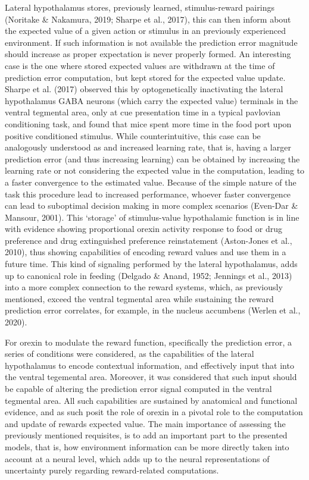 \documentclass[
]{/home/nicoluarte/Downloads/templates/PNAS-template-main.tex}
\begin{document}
Lateral hypothalamus stores, previously learned, stimulus-reward
pairings (Noritake \& Nakamura, 2019; Sharpe et al., 2017), this can
then inform about the expected value of a given action or stimulus in an
previously experienced environment. If such information is not available
the prediction error magnitude should increase as proper expectation is
never properly formed. An interesting case is the one where stored
expected values are withdrawn at the time of prediction error
computation, but kept stored for the expected value update. Sharpe et
al. (2017) observed this by optogenetically inactivating the lateral
hypothalamus GABA neurons (which carry the expected value) terminals in
the ventral tegmental area, only at cue presentation time in a typical
pavlovian conditioning task, and found that mice spent more time in the
food port upon positive conditioned stimulus. While counterintuitive,
this case can be analogously understood as and increased learning rate,
that is, having a larger prediction error (and thus increasing learning)
can be obtained by increasing the learning rate or not considering the
expected value in the computation, leading to a faster convergence to
the estimated value. Because of the simple nature of the task this
procedure lead to increased performance, whoever faster convergence can
lead to suboptimal decision making in more complex scenarios (Even-Dar
\& Mansour, 2001). This `storage' of stimulus-value hypothalamic
function is in line with evidence showing proportional orexin activity
response to food or drug preference and drug extinguished preference
reinstatement (Aston-Jones et al., 2010), thus showing capabilities of
encoding reward values and use them in a future time. This kind of
signaling performed by the lateral hypothalamus, adds up to canonical
role in feeding (Delgado \& Anand, 1952; Jennings et al., 2013) into a
more complex connection to the reward systems, which, as previously
mentioned, exceed the ventral tegmental area while sustaining the reward
prediction error correlates, for example, in the nucleus accumbens
(Werlen et al., 2020).

For orexin to modulate the reward function, specifically the prediction
error, a series of conditions were considered, as the capabilities of
the lateral hypothalamus to encode contextual information, and
effectively input that into the ventral tegemental area. Moreover, it
was considered that such input should be capable of altering the
prediction error signal computed in the ventral tegmental area. All such
capabilities are sustained by anatomical and functional evidence, and as
such posit the role of orexin in a pivotal role to the computation and
update of rewards expected value. The main importance of assessing the
previously mentioned requisites, is to add an important part to the
presented models, that is, how environment information can be more
directly taken into account at a neural level, which adds up to the
neural representations of uncertainty purely regarding reward-related
computations.
\end{document}
